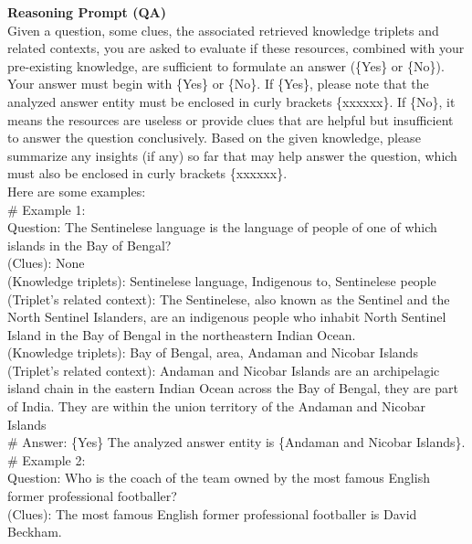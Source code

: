 \documentclass[11pt,UTF8,fontset=fandol]{ctexart}
\begin{document}
\begin{table}[H]\centering
\caption{Reasoning Prompt (QA)（推理提示词，问答）。}
\label{tab:18}
\end{table}
\vspace{-1.2em}
\begin{promptbox}
\small
\textbf{Reasoning Prompt (QA)}\\
Given a question, some clues, the associated retrieved knowledge triplets and related contexts, you are asked to evaluate if these resources, combined with your pre-existing knowledge, are sufficient to formulate an answer (\{Yes\} or \{No\}). Your answer must begin with \{Yes\} or \{No\}. If \{Yes\}, please note that the analyzed answer entity must be enclosed in curly brackets \{xxxxxx\}. If \{No\}, it means the resources are useless or provide clues that are helpful but insufficient to answer the question conclusively. Based on the given knowledge, please summarize any insights (if any) so far that may help answer the question, which must also be enclosed in curly brackets \{xxxxxx\}.\\[0.3em]
Here are some examples:\\
\# Example 1:\\
Question: The Sentinelese language is the language of people of one of which islands in the Bay of Bengal?\\
(Clues): None\\
(Knowledge triplets): Sentinelese language, Indigenous to, Sentinelese people\\
(Triplet's related context): The Sentinelese, also known as the Sentinel and the North Sentinel Islanders, are an indigenous people who inhabit North Sentinel Island in the Bay of Bengal in the northeastern Indian Ocean.\\
(Knowledge triplets): Bay of Bengal, area, Andaman and Nicobar Islands\\
(Triplet's related context): Andaman and Nicobar Islands are an archipelagic island chain in the eastern Indian Ocean across the Bay of Bengal, they are part of India. They are within the union territory of the Andaman and Nicobar Islands\\
\# Answer: \{Yes\} The analyzed answer entity is \{Andaman and Nicobar Islands\}.\\[0.3em]
\# Example 2:\\
Question: Who is the coach of the team owned by the most famous English former professional footballer?\\
(Clues): The most famous English former professional footballer is David Beckham.\\

\end{promptbox}
\end{document}
